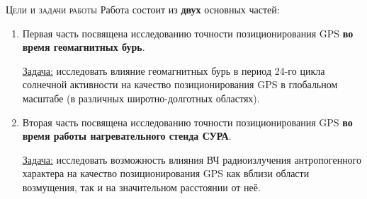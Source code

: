 \begin{frame}{\textsc{Цели и задачи работы}}
Работа состоит из \textbf{двух} основных частей:
\begin{enumerate}
\justifying
\item Первая часть посвящена исследованию точности позиционирования GPS \textbf{во время геомагнитных бурь}.  

\underline{Задача:} исследовать влияние геомагнитных бурь в период 24-го цикла солнечной активности на качество позиционирования GPS в глобальном масштабе (в различных широтно-долготных областях).
\item Вторая часть посвящена исследованию точности позиционирования GPS \textbf{во время работы нагревательного стенда СУРА}.

\underline{Задача:} исследовать возможность влияния ВЧ радиоизлучения антропогенного характера на качество позиционирования GPS как вблизи области возмущения, так и на значительном расстоянии от неё.
\end{enumerate}
\end{frame}